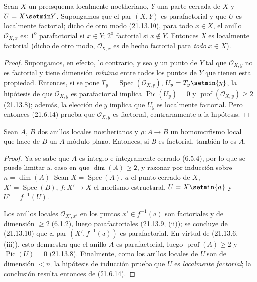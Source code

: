 \begin{corollary}[21.13.11]
\label{IV.21.13.11}
Sean $X$ un preesquema localmente noetheriano, $Y$ una parte cerrada de $X$ y
$U=X\setmin Y$. Supongamos que el par $(X,Y)$ es parafactorial y que $U$ es
localmente factorial; dicho de otro modo \textup{(21.13.10)}, para todo $x\in X$, el anillo
$\mathcal O_{X,x}$ es: $1^{\mathrm o}$ parafactorial si $x\in Y$;
$2^{\mathrm o}$ factorial si $x\notin Y$. Entonces $X$ es localmente factorial
\textup{(dicho de otro modo, $\mathcal O_{X,x}$ es de hecho factorial para \emph{todo} $x\in X$)}.
\end{corollary}

\begin{proof}
Supongamos, en efecto, lo contrario, y sea $y$ un punto de $Y$ tal que
$\mathcal O_{X,y}$ no es factorial y tiene dimensión \emph{mínima} entre
todos los puntos de $Y$ que tienen esta propiedad. Entonces, si se pone
$T_y=\operatorname{Spec}(\mathcal O_{X,y})$, $U_y=T_y\setmin\{y\}$, la hipótesis de que
$\mathcal O_{X,y}$ es parafactorial implica $\operatorname{Pic}(U_y)=0$ y
$\operatorname{prof}(\mathcal O_{X,y})\geq2$ (21.13.8); además, la elección de $y$
implica que $U_y$ es localmente factorial. Pero entonces (21.6.14) prueba que
$\mathcal O_{X,y}$ es factorial, contrariamente a la hipótesis.
\end{proof}

\begin{proposition}[21.13.12]
\label{IV.21.13.12}
Sean $A$, $B$ dos anillos locales noetherianos y
$\rho:A\to B$ un homomorfismo local que hace de $B$ un $A$-módulo plano. Entonces, si
$B$ es factorial, también lo es $A$.
\end{proposition}

\begin{proof}
Ya se sabe que $A$ es íntegro e íntegramente cerrado (6.5.4), por lo que se puede limitar
al caso en que $\dim(A)\geq2$, y razonar por inducción sobre $n=\dim(A)$. Sean
$X=\operatorname{Spec}(A)$, $a$ el punto cerrado de $X$,
$X'=\operatorname{Spec}(B)$, $f:X'\to X$ el morfismo estructural,
$U=X\setmin\{a\}$ y $U'=f^{-1}(U)$.

Los anillos locales $\mathcal O_{X',x'}$ en los puntos $x'\in f^{-1}(a)$ son factoriales
y de dimensión $\geq2$ (6.1.2), luego parafactoriales (21.13.9, (ii)); se concluye de
(21.13.10) que el par $(X',f^{-1}(a))$ es parafactorial. En virtud de (21.13.6,
(iii)), esto demuestra que el anillo $A$ es parafactorial, luego
$\operatorname{prof}(A)\geq2$ y $\operatorname{Pic}(U)=0$ (21.13.8). Finalmente, como los
anillos locales de $U$ son de dimensión $<n$, la hipótesis de inducción prueba que
$U$ es \emph{localmente factorial}; la conclusión resulta entonces de (21.6.14).
\end{proof}


